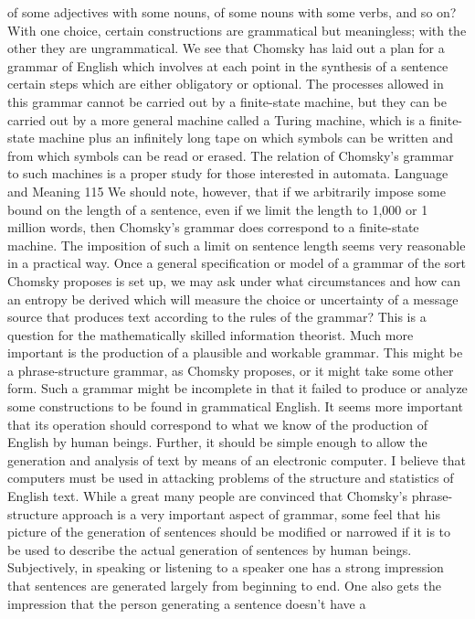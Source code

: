 {{{of some adjectives with some nouns, of some nouns with
some verbs, and so on? With one choice, certain constructions are
grammatical but meaningless; with the other they are ungrammatical.
We see that Chomsky has laid out a plan for a grammar of
English which involves at each point in the synthesis of a sentence
certain steps which are either obligatory or optional. The processes
allowed in this grammar cannot be carried out by a finite-state
machine, but they can be carried out by a more general machine
called a Turing machine, which is a finite-state machine plus an
infinitely long tape on which symbols can be written and from
which symbols can be read or erased. The relation of Chomsky’s
grammar to such machines is a proper study for those interested
in automata.
Language and Meaning 115
We should note, however, that if we arbitrarily impose some
bound on the length of a sentence, even if we limit the length to
1,000 or 1 million words, then Chomsky’s grammar does correspond
to a finite-state machine. The imposition of such a limit on sentence
length seems very reasonable in a practical way.
Once a general specification or model of a grammar of the sort
Chomsky proposes is set up, we may ask under what circumstances
and how can an entropy be derived which will measure the choice
or uncertainty of a message source that produces text according
to the rules of the grammar? This is a question for the mathematically
skilled information theorist.
Much more important is the production of a plausible and
workable grammar. This might be a phrase-structure grammar, as
Chomsky proposes, or it might take some other form. Such a
grammar might be incomplete in that it failed to produce or analyze
some constructions to be found in grammatical English. It
seems more important that its operation should correspond to what
we know of the production of English by human beings. Further,
it should be simple enough to allow the generation and analysis
of text by means of an electronic computer. I believe that computers
must be used in attacking problems of the structure and
statistics of English text.
While a great many people are convinced that Chomsky’s
phrase-structure approach is a very important aspect of grammar,
some feel that his picture of the generation of sentences should be
modified or narrowed if it is to be used to describe the actual generation
of sentences by human beings. Subjectively, in speaking
or listening to a speaker one has a strong impression that sentences
are generated largely from beginning to end. One also gets the
impression that the person generating a sentence doesn’t have a
}}}

